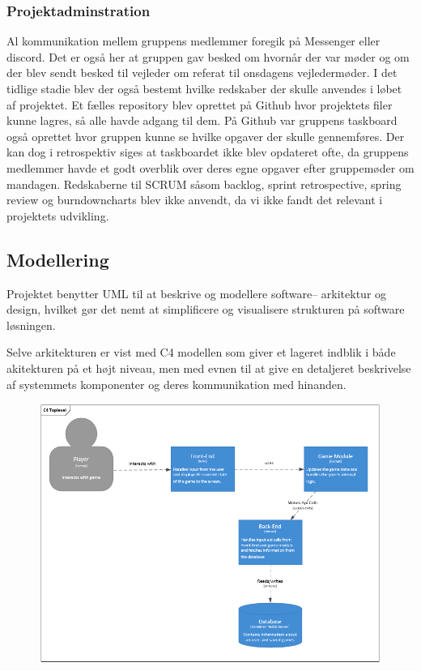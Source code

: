 \subsubsection{Projektadminstration}
Al kommunikation mellem gruppens medlemmer foregik på Messenger eller discord. Det er også her at gruppen gav besked om hvornår der var møder og om der blev sendt besked til vejleder om referat til onsdagens vejledermøder. I det tidlige stadie blev der også bestemt hvilke redskaber der skulle anvendes i løbet af projektet. Et fælles repository blev oprettet på Github hvor projektets filer kunne lagres, så alle havde adgang til dem. På Github var gruppens taskboard også oprettet hvor gruppen kunne se hvilke opgaver der skulle gennemføres. Der kan dog i retrospektiv siges at taskboardet ikke blev opdateret ofte, da gruppens medlemmer havde et godt overblik over deres egne opgaver efter gruppemøder om mandagen. Redskaberne til SCRUM såsom backlog, sprint retrospective, spring review og burndowncharts blev ikke anvendt, da vi ikke fandt det relevant i projektets udvikling.  

\subsection{Modellering}
Projektet benytter UML til at beskrive og modellere software-- arkitektur
og design, hvilket gør det nemt at simplificere og visualisere strukturen på software
løsningen. 

Selve arkitekturen er vist med C4 modellen som giver et lageret indblik i både
akitekturen på et højt niveau, men med evnen til at give en detaljeret beskrivelse
af systemmets komponenter og deres kommunikation med hinanden.

\begin{figure}[H]
  \centering
  \includegraphics[scale=0.8]{02-Body/Images/C4TopLvlDB.PNG}
  \label{fig:c4}
\end{figure}

